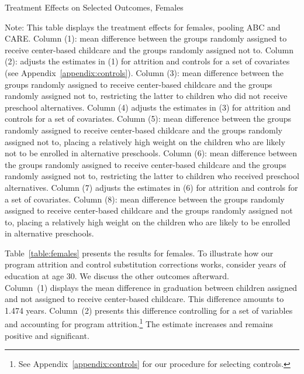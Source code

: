 \begin{table}[H] 
\begin{threeparttable}
\caption{Treatment Effects on Selected Outcomes, Females}
\label{table:females}
\centering
\scalebox{.97}{
}
\begin{tablenotes}
\footnotesize
\item Note: This table displays the treatment effects for females, pooling ABC and CARE. Column (1): mean difference between the groups randomly assigned to receive center-based childcare and the groups randomly assigned not to. Column (2): adjusts the estimates in (1) for attrition and controls for a set of covariates (see Appendix~\ref{appendix:controls}). Column (3): mean difference between the groups randomly assigned to receive center-based childcare and the groups randomly assigned not to, restricting the latter to children who did not receive preschool alternatives. Column (4) adjusts the estimates in (3) for attrition and controls for a set of covariates. Column (5): mean difference between the groups randomly assigned to receive center-based childcare and the groups randomly assigned not to, placing a relatively high weight on the children who are likely not to be enrolled in alternative preschools. Column (6): mean difference between the groups randomly assigned to receive center-based childcare and the groups randomly assigned not to, restricting the latter to children who received preschool alternatives. Column (7) adjusts the estimates in (6) for attrition and controls for a set of covariates. Column (8): mean difference between the groups randomly assigned to receive center-based childcare and the groups randomly assigned not to, placing a relatively high weight on the children who are likely to be enrolled in alternative preschools.
\end{tablenotes}
\end{threeparttable}
\end{table}


\noindent Table~\ref{table:females} presents the results for females. To illustrate how our program attrition and control substitution corrections works, consider years of education at age 30. We discuss the other outcomes afterward.\\

\noindent Column~(1) displays the mean difference in graduation between children assigned and not assigned to receive center-based childcare. This difference amounts to 1.474 years. Column~(2) presents this difference controlling for a set of variables and accounting for program attrition.\footnote{See Appendix~\ref{appendix:controls} for our procedure for selecting controls.} The estimate increases and remains positive and significant.\\ 

